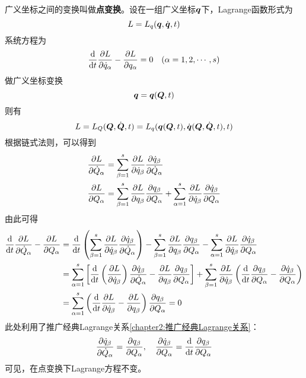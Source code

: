 广义坐标之间的变换叫做{\bf 点变换}。设在一组广义坐标$\boldsymbol{q}$下，Lagrange函数形式为
\begin{equation*}
	L = L_q(\boldsymbol{q},\dot{\boldsymbol{q}},t)
\end{equation*}
系统方程为
\begin{equation}
	\frac{\mathrm{d}}{\mathrm{d} t} \frac{\partial L}{\partial \dot{q}_\alpha} - \frac{\partial L}{\partial q_\alpha} = 0 \quad (\alpha = 1,2,\cdots,s)
\end{equation}
做广义坐标变换
\begin{equation}
	\boldsymbol{q} = \boldsymbol{q}(\boldsymbol{Q},t)
	\label{chapter10:点变换}
\end{equation}
则有
\begin{equation}
	L = L_Q(\boldsymbol{Q},\dot{\boldsymbol{Q}},t) = L_q(\boldsymbol{q}(\boldsymbol{Q},t),\dot{\boldsymbol{q}}(\boldsymbol{Q},\dot{\boldsymbol{Q}},t),t)
\end{equation}
根据链式法则，可以得到
\begin{align}
	\frac{\partial L}{\partial \dot{Q}_\alpha} & = \sum_{\beta=1}^s \frac{\partial L}{\partial \dot{q}_\beta} \frac{\partial \dot{q}_\beta}{\partial \dot{Q}_\alpha} \\
	\frac{\partial L}{\partial Q_\alpha} & = \sum_{\beta=1}^s \frac{\partial L}{\partial q_\beta} \frac{\partial q_\beta}{\partial Q_\alpha} + \sum_{\alpha=1}^s \frac{\partial L}{\partial \dot{q}_\beta} \frac{\partial \dot{q}_\beta}{\partial Q_\alpha} 
\end{align}
由此可得
\begin{align*}
	\frac{\mathrm{d}}{\mathrm{d} t} \frac{\partial L}{\partial \dot{Q}_\alpha} - \frac{\partial L}{\partial Q_\alpha} & = \frac{\mathrm{d}}{\mathrm{d} t} \left(\sum_{\beta=1}^s \frac{\partial L}{\partial \dot{q}_\beta} \frac{\partial \dot{q}_\beta}{\partial \dot{Q}_\alpha}\right) - \sum_{\beta=1}^s \frac{\partial L}{\partial q_\beta} \frac{\partial q_\beta}{\partial Q_\alpha} - \sum_{\alpha=1}^s \frac{\partial L}{\partial \dot{q}_\beta} \frac{\partial \dot{q}_\beta}{\partial Q_\alpha} \\
	& = \sum_{\alpha=1}^s \left[\frac{\mathrm{d}}{\mathrm{d} t} \left(\frac{\partial L}{\partial \dot{q}_\beta}\right) \frac{\partial \dot{q}_\beta}{\partial \dot{Q}_\alpha} - \frac{\partial L}{\partial q_\beta} \frac{\partial q_\beta}{\partial Q_\alpha}\right] + \sum_{\beta=1}^s \frac{\partial L}{\partial \dot{q}_\beta} \left(\frac{\mathrm{d}}{\mathrm{d} t} \frac{\partial q_\beta}{\partial Q_\alpha} - \frac{\partial \dot{q}_\beta}{\partial Q_\alpha}\right) \\
	& = \sum_{\alpha=1}^s \left(\frac{\mathrm{d}}{\mathrm{d} t} \frac{\partial L}{\partial \dot{q}_\beta} - \frac{\partial L}{\partial q_\beta}\right) \frac{\partial q_\beta}{\partial Q_\alpha} = 0
\end{align*}
此处利用了推广经典Lagrange关系\eqref{chapter2:推广经典Lagrange关系}：
\begin{equation*}
	\frac{\partial \dot{q}_\beta}{\partial \dot{Q}_\alpha} = \frac{\partial q_\beta}{\partial Q_\alpha},\quad \frac{\partial \dot{q}_\beta}{\partial Q_\alpha} = \frac{\mathrm{d}}{\mathrm{d} t} \frac{\partial q_\beta}{\partial Q_\alpha}
\end{equation*}
可见，在点变换下Lagrange方程不变。

